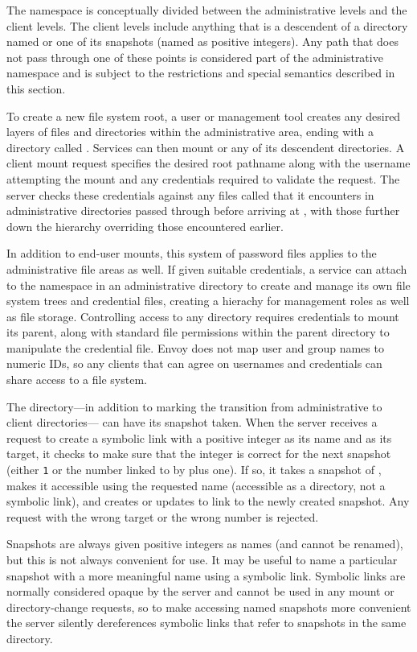 The namespace is conceptually divided between the administrative levels and the client levels. The client levels include anything that is a descendent of a directory named \current or one of its snapshots (named as positive integers). Any path that does not pass through one of these points is considered part of the administrative namespace and is subject to the restrictions and special semantics described in this section.

To create a new file system root, a user or management tool creates any desired layers of files and directories within the administrative area, ending with a directory called \current. Services can then mount \current or any of its descendent directories. A client mount request specifies the desired root pathname along with the username attempting the mount and any credentials required to validate the request. The server checks these credentials against any files called \password that it encounters in administrative directories passed through before arriving at \current, with those further down the hierarchy overriding those encountered earlier.

In addition to end-user mounts, this system of password files applies to the administrative file areas as well. If given suitable credentials, a service can attach to the namespace in an administrative directory to create and manage its own file system trees and credential files, creating a hierachy for management roles as well as file storage. Controlling access to any directory requires credentials to mount its parent, along with standard file permissions within the parent directory to manipulate the credential file. Envoy does not map user and group names to numeric IDs, so any clients that can agree on usernames and credentials can share access to a file system.

The \current directory---in addition to marking the transition from administrative to client directories--- can have its snapshot taken. When the server receives a request to create a symbolic link with a positive integer as its name and \current as its target, it checks to make sure that the integer is correct for the next snapshot (either \texttt{1} or the number linked to by \snapshot plus one). If so, it takes a snapshot of \current, makes it accessible using the requested name (accessible as a directory, not a symbolic link), and creates or updates \snapshot to link to the newly created snapshot. Any request with the wrong target or the wrong number is rejected.

Snapshots are always given positive integers as names (and cannot be renamed), but this is not always convenient for use. It may be useful to name a particular snapshot with a more meaningful name using a symbolic link. Symbolic links are normally considered opaque by the server and cannot be used in any mount or directory-change requests, so to make accessing named snapshots more convenient the server silently dereferences symbolic links that refer to snapshots in the same directory.

